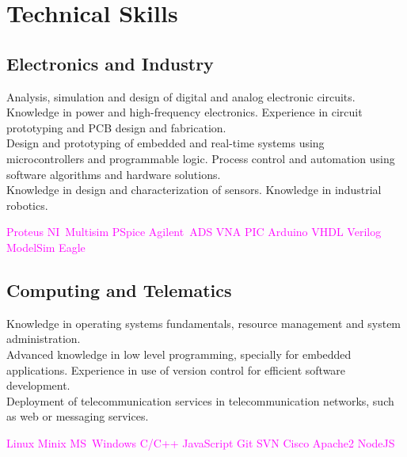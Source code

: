 \documentclass[11pt,a4paper,sans,spanish]{moderncv}
\begin{document}



 
\section{Technical Skills}

\subsection{Electronics and Industry}
Analysis, simulation and design of digital and analog electronic circuits. Knowledge in power and high-frequency electronics. Experience in circuit prototyping and PCB design and fabrication.
\protect\\[0.4em]
Design and prototyping of embedded and real-time systems using microcontrollers and programmable logic.
Process control and automation using software algorithms and hardware solutions.
\protect\\[0.4em]
Knowledge in design and characterization of sensors. Knowledge in industrial robotics.

\begin{center}
\textcolor{magenta}{
Proteus \quad{} NI~Multisim \quad{} PSpice \quad{} Agilent~ADS \quad{} VNA \quad{} PIC \quad{} Arduino \quad{} VHDL \quad{} Verilog \quad{} ModelSim \quad{} Eagle
}
\end{center}

\subsection{Computing and Telematics}
Knowledge in operating systems fundamentals, resource management and system administration.
\protect\\[0.4em]
Advanced knowledge in low level programming, specially for embedded applications.
Experience in use of version control for efficient software development.
\protect\\[0.4em]
Deployment of telecommunication services in telecommunication networks, such as web or messaging services.

\begin{center}
\textcolor{magenta}{
Linux \quad{} Minix \quad{} MS~Windows \quad{} C/C++ \quad{} JavaScript \quad{} Git \quad{} SVN \quad{} Cisco \quad{} Apache2 \quad{} NodeJS
}
\end{center}
\end{document}
